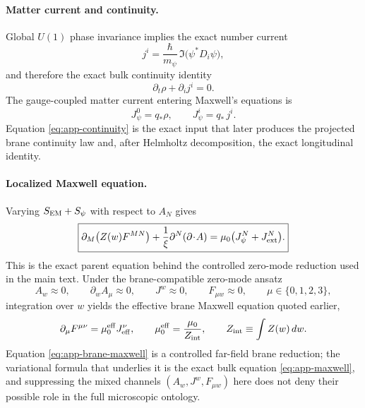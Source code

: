 \documentclass[11pt]{article}
\newcommand{\Zloc}{Z}
\newcommand{\qstar}{q_*}
\begin{document}
\paragraph{Matter current and continuity.}
Global \(U(1)\) phase invariance implies the exact number current
\begin{equation}
j^i
=
\frac{\hbar}{m_\psi}\,\Im\!\bigl(\psi^*D_i\psi\bigr),
\label{eq:app-current}
\end{equation}
and therefore the exact bulk continuity identity
\begin{equation}
\boxed{
\partial_t\rho+\partial_i j^i=0.
}
\label{eq:app-continuity}
\end{equation}
The gauge-coupled matter current entering Maxwell's equations is
\begin{equation}
J_\psi^0 = \qstar\rho,
\qquad
J_\psi^i = \qstar\,j^i.
\label{eq:app-gauge-current}
\end{equation}
Equation \eqref{eq:app-continuity} is the exact input that later produces the projected
brane continuity law and, after Helmholtz decomposition, the exact longitudinal identity.

\paragraph{Localized Maxwell equation.}
Varying \(S_{\rm EM}+S_\psi\) with respect to \(A_N\) gives
\begin{equation}
\boxed{
\partial_M\!\left(\Zloc(w)F^{MN}\right)
+
\frac{1}{\xi}\partial^N(\partial\!\cdot\!A)
=
\mu_0\bigl(J_\psi^N+J_{\rm ext}^N\bigr).
}
\label{eq:app-maxwell}
\end{equation}
This is the exact parent equation behind the controlled zero-mode reduction used in the
main text. Under the brane-compatible zero-mode ansatz
\begin{equation}
A_w\approx0,
\qquad
\partial_w A_\mu \approx 0,
\qquad
J^w \approx 0,
\qquad
F_{\mu w} \approx 0,
\qquad
\mu\in\{0,1,2,3\},
\label{eq:app-zero-mode}
\end{equation}
integration over \(w\) yields the effective brane Maxwell equation quoted earlier,
\begin{equation}
\partial_\mu F^{\mu\nu}
=
\mu_0^{\rm eff}J_{\rm eff}^\nu,
\qquad
\mu_0^{\rm eff}
=
\frac{\mu_0}{Z_{\rm int}},
\qquad
Z_{\rm int}\equiv \int \Zloc(w)\,dw.
\label{eq:app-brane-maxwell}
\end{equation}
Equation \eqref{eq:app-brane-maxwell} is a controlled far-field brane reduction; the
variational formula that underlies it is the exact bulk equation \eqref{eq:app-maxwell},
and suppressing the mixed channels \((A_w,J^w,F_{\mu w})\) here does not deny their
possible role in the full microscopic ontology.
\end{document}
